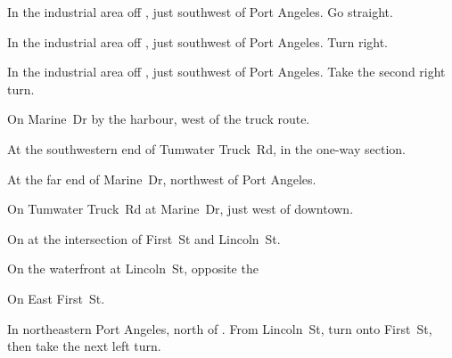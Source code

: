 
\begin{LocationList}

In the industrial area off , just southwest of Port Angeles.
Go straight.

In the industrial area off , just southwest of Port Angeles.
Turn right.

In the industrial area off , just southwest of Port Angeles.
Take the second right turn.

\Location{\GasStation \Gas \Rest}
On Marine~Dr by the harbour, west of the truck route.

At the southwestern end of Tumwater Truck~Rd, in the one-way section.

At the far end of Marine~Dr, northwest of Port Angeles.

On Tumwater Truck~Rd at Marine~Dr, just west of downtown.

On  at the intersection of First~St and Lincoln~St.

\Location{\TruckService \Service \Rest}
On the waterfront at Lincoln~St, opposite the 

On  East First~St.

In northeastern Port Angeles, north of .
From  Lincoln~St, turn onto  First~St, then take the next left turn.

\end{LocationList}
